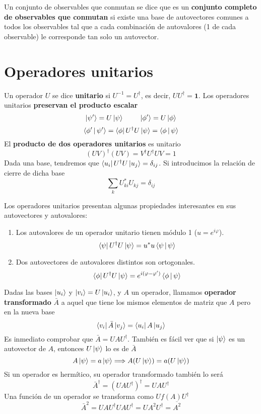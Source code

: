 \documentclass[12pt]{report}
\begin{document}
Un conjunto de observables que conmutan se dice que es un \textbf{conjunto completo de observables que conmutan} si existe una base de autovectores comunes a todos los observables tal que a cada combinación de autovalores (1 de cada observable) le corresponde tan solo un autovector.

\section{Operadores unitarios}
Un operador $U$ se dice \textbf{unitario} si $U^{-1}=U^\dagger$, es decir, $UU^\dagger =\textbf{1}$. Los operadores unitarios \textbf{preservan el producto escalar}
\[ \ket{\psi '}=U\ket{\psi}\ \ \ \ \ \ \ \ket{\phi '}=U\ket{\phi}\]
\begin{equation}
    \Braket{\phi '|\psi '}=\bra{\phi}U^\dagger U\ket{\psi}=\Braket{\phi |\psi}
\end{equation}
El \textbf{producto de dos operadores unitarios} es unitario
\begin{equation}
    (UV)^\dagger (UV)=V^\dagger U^\dagger UV=1
\end{equation}
Dada una base, tendremos que $\bra{u_i}U^\dagger U\ket{u_j}=\delta_{ij}$. Si introducimos la relación de cierre de dicha base
\begin{equation}
    \sum_k U_{ki}^{\ast}U_{kj}=\delta_{ij}
\end{equation}

Los operadores unitarios presentan algunas propiedades interesantes en sus autovectores y autovalores:
\begin{enumerate}
    \item Los autovalores de un operador unitario tienen módulo 1 ($u=e^{i\varphi}$).
    \[ \bra{\psi}U^\dagger U\ket{\psi}=u^{\ast}u\Braket{\psi |\psi}\]
    \item Dos autovectores de autovalores distintos son ortogonales.
    \[ \bra{\phi}U^\dagger U\ket{\psi}=e^{i(\varphi -\varphi ')}\Braket{\phi |\psi} \]
\end{enumerate}
Dadas las bases $\ket{u_i}$ y $\ket{v_i}=U\ket{u_i}$, y $A$ un operador, llamamos \textbf{operador transformado} $\bar{A}$ a aquel que tiene los mismos elementos de matriz que $A$ pero en la nueva base
\begin{equation}
    \bra{v_i}\bar{A}\ket{v_j}=\bra{u_i}A\ket{u_j}
\end{equation}
Es inmediato comprobar que $\bar{A}=UAU^\dagger$. También es fácil ver que si $\ket{\psi}$ es un autovector de $A$, entonces $U\ket{\psi}$ lo es de $\bar{A}$
\begin{equation}
    A\ket{\psi}=a\ket{\psi}\Longrightarrow A(U\ket{\psi})=a(U\ket{\psi}) 
\end{equation}
Si un operador es hermítico, su operador transformado también lo será
\begin{equation}
    \bar{A}^\dagger =(UAU^\dagger )^\dagger =UAU^\dagger
\end{equation}
Una función de un operador se transforma como $Uf(A)U^\dagger$
\begin{equation}
    \bar{A}^2=UAU^\dagger UAU^\dagger =UA^2U^\dagger =\overline{A^2}
\end{equation}
\end{document}
